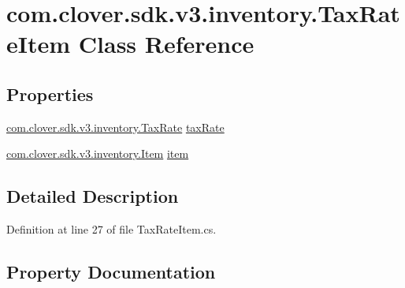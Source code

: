 \hypertarget{classcom_1_1clover_1_1sdk_1_1v3_1_1inventory_1_1_tax_rate_item}{}\section{com.\+clover.\+sdk.\+v3.\+inventory.\+Tax\+Rate\+Item Class Reference}
\label{classcom_1_1clover_1_1sdk_1_1v3_1_1inventory_1_1_tax_rate_item}
\subsection*{Properties}
\begin{DoxyCompactItemize}
\item 
\hyperlink{classcom_1_1clover_1_1sdk_1_1v3_1_1inventory_1_1_tax_rate}{com.\+clover.\+sdk.\+v3.\+inventory.\+Tax\+Rate} \hyperlink{classcom_1_1clover_1_1sdk_1_1v3_1_1inventory_1_1_tax_rate_item_a7003ea33a4a4bbd1f03d1149d44269ed}{tax\+Rate}
\item 
\hyperlink{classcom_1_1clover_1_1sdk_1_1v3_1_1inventory_1_1_item}{com.\+clover.\+sdk.\+v3.\+inventory.\+Item} \hyperlink{classcom_1_1clover_1_1sdk_1_1v3_1_1inventory_1_1_tax_rate_item_a21184b4929531cc3358426a16a4ccb3d}{item}
\end{DoxyCompactItemize}


\subsection{Detailed Description}


Definition at line 27 of file Tax\+Rate\+Item.\+cs.



\subsection{Property Documentation}
\mbox{\label{classcom_1_1clover_1_1sdk_1_1v3_1_1inventory_1_1_tax_rate_item_a21184b4929531cc3358426a16a4ccb3d}} 
